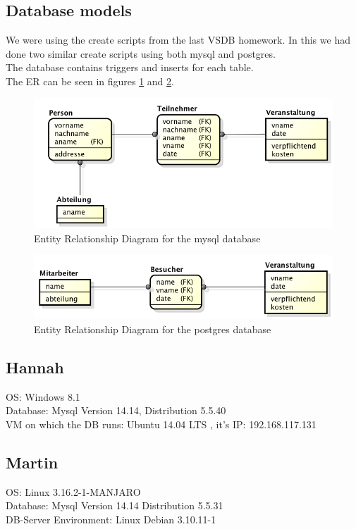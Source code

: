 \documentclass[10pt]{article}
\begin{document}
\subsection{Database models}
We were using the create scripts from the last VSDB homework. In this we had done two similar create scripts using both mysql and postgres. \\ The database contains triggers and inserts for each table.\\ The ER can be seen in figures \ref{mysqler} and \ref{pger}.
\begin{figure}[!h]
	\begin{center}
		\includegraphics[width=0.8\linewidth]{pictures/ERD_mysql}
		\caption{Entity Relationship Diagram for the mysql database}
		\label{mysqler}
	\end{center}
\end{figure}
\begin{figure}[!h]
	\begin{center}
		\includegraphics[width=0.8\linewidth]{pictures/ERD_psql}
		\caption{Entity Relationship Diagram for the postgres database}
		\label{pger}
	\end{center}
\end{figure}
\FloatBarrier
\subsection{Hannah}
OS: Windows 8.1 \\
Database: Mysql Version 14.14, Distribution 5.5.40 \\
VM on which the DB runs: Ubuntu 14.04 LTS , it's IP: 192.168.117.131
\subsection{Martin}
OS: Linux 3.16.2-1-MANJARO\\
Database: Mysql Version 14.14 Distribution 5.5.31\\
DB-Server Environment: Linux Debian 3.10.11-1
\newpage
\newpage
\end{document}
